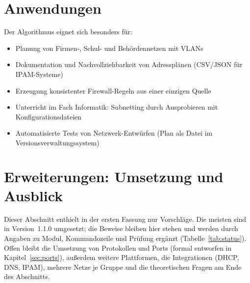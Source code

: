 \documentclass[a4paper,12pt, twoside]{report}
\theoremstyle{definition}
\begin{document}
\section{Anwendungen}

Der Algorithmus eignet sich besonders für:
\begin{itemize}
	\item Planung von Firmen-, Schul- und Behördennetzen mit VLANs
	\item Dokumentation und Nachvollziehbarkeit von Adressplänen (CSV/JSON für IPAM-Systeme)
	\item Erzeugung konsistenter Firewall-Regeln aus einer einzigen Quelle
	\item Unterricht im Fach Informatik: Subnetting durch Ausprobieren mit Konfigurationsdateien
	\item Automatisierte Tests von Netzwerk-Entwürfen (Plan als Datei im Versionsverwaltungssystem)
\end{itemize}

\section{Erweiterungen: Umsetzung und Ausblick}
\label{sec:ausblick}

Dieser Abschnitt enthielt in der ersten Fassung nur Vorschläge. Die meisten sind in Version~1.1.0 umgesetzt; die Beweise bleiben hier stehen und werden durch Angaben zu Modul, Kommandozeile und Prüfung ergänzt (Tabelle~\ref{tab:status}). Offen bleibt die Umsetzung von Protokollen und Ports (formal entworfen in Kapitel~\ref{sec:ports}), außerdem weitere Plattformen, die Integrationen (DHCP, DNS, IPAM), mehrere Netze je Gruppe und die theoretischen Fragen am Ende des Abschnitts.
\end{document}
